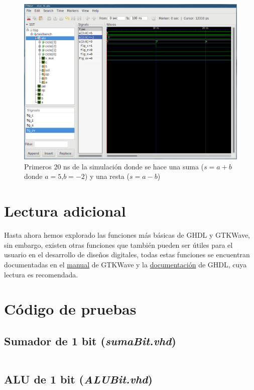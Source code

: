 \documentclass[11pt]{article}
\begin{document}
\begin{figure}[H]
    \centering
    \includegraphics[width=.75\linewidth]{gtkwave7.png}
    \caption{Primeros 20 \unit{\nano\second} de la simulación donde se hace una
    suma ($s = a+b$ donde $a = 5$,$b = -2$) y una resta ($s = a-b$)}
    \label{fig:gtkwave-7}
\end{figure}

\section{Lectura adicional}

Hasta ahora hemos explorado las funciones más básicas de GHDL y GTKWave, 
sin embargo, existen otras funciones que también pueden ser útiles para el 
usuario en el desarrollo de diseños digitales, todas estas funciones se 
encuentran documentadas en el \href{http://gtkwave.sourceforge.net/gtkwave.pdf}{manual} 
de GTKWave y la \href{https://ghdl.github.io/ghdl/index.html}{documentación} de
GHDL, cuya lectura es recomendada.

\appendix

\newpage
\section{Código de pruebas} \label{appendix-a}

\subsection{Sumador de 1 bit (\textit{sumaBit.vhd})}
\inputminted[frame=lines, framesep=4mm]{vhdl}{src/sumaBit.vhd}

\subsection{ALU de 1 bit (\textit{ALUBit.vhd})}
\inputminted[frame=lines, framesep=4mm]{vhdl}{src/ALUBit.vhd}
\end{document}
